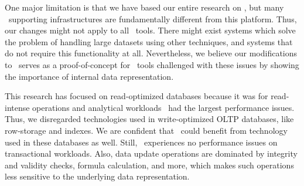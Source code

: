 One major limitation is that we have based our entire research on \gap, but many \mde~supporting infrastructures are fundamentally different from this platform. Thus, our changes might not apply to all \mdd~tools. There might exist systems which solve the problem of handling large datasets using other techniques, and systems that do not require this functionality at all. Nevertheless, we believe our modifications to \gap~serves as a proof-of-concept for \mdd~tools challenged with these issues by showing the importance of internal data representation.

This research has focused on read-optimized databases because it was for read-intense operations and analytical workloads \gap~had the largest performance issues. Thus, we disregarded technologies used in write-optimized OLTP databases, like row-storage and indexes. We are confident that \gap~could benefit from technology used in these databases as well. Still, \genus~experiences no performance issues on transactional workloads. Also, data update operations are dominated by integrity and validity checks, formula calculation, and more, which makes such operations less sensitive to the underlying data representation.

